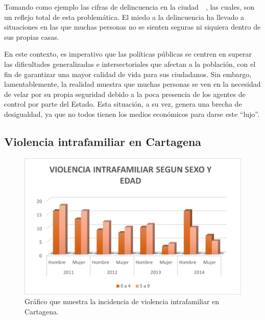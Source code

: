 \documentclass[letterpaper, 12pt]{article}
\begin{document}
Tomando como ejemplo las cifras de delincuencia en la
ciudad~\cite{cifras_crimenes_1}~\cite{cifras_crimenes_2},
las cuales, son un reflejo total de esta problemática. El
miedo a la delincuencia ha llevado a situaciones en las que
muchas personas no se sienten seguras ni siquiera dentro de
sus propias casas.

En este contexto, es imperativo que las políticas públicas
se centren en superar las dificultades generalizadas e
intersectoriales que afectan a la población, con el fin de
garantizar una mayor calidad de vida para sus ciudadanos.
Sin embargo, lamentablemente, la realidad muestra que
muchas personas se ven en la necesidad de velar por su
propia seguridad debido a la poca presencia de los agentes
de control por parte del Estado. Esta situación, a su vez,
genera una brecha de desigualdad, ya que no todos tienen
los medios económicos para darse este ``lujo''.






\subsection*{Violencia intrafamiliar en Cartagena}

\begin{figure}[H]
    \begin{center}
        \includegraphics[width=.8\linewidth]{./Images/Graph.ViolenciaIntrafamiliarCartagena.png}
        \caption{Gráfico que muestra la incidencia de violencia intrafamiliar en Cartagena.}
        \label{fig:Graph.ViolenciaIntrafamiliarCartagena}
    \end{center}
\end{figure}
\end{document}
